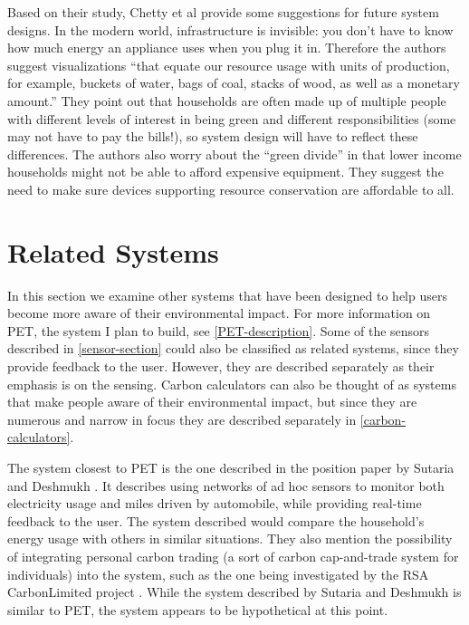 Based on their study, Chetty et al provide some suggestions for future system designs. In the modern world, infrastructure is invisible: you don't have to know how much energy an appliance uses when you plug it in. Therefore the authors suggest visualizations ``that equate our resource usage with units of production, for example, buckets of water, bags of coal, stacks of wood, as well as a monetary amount.'' They point out that households are often made up of multiple people with different levels of interest in being green and different responsibilities (some may not have to pay the bills!), so system design will have to reflect these differences. The authors also worry about the ``green divide'' in that lower income households might not be able to afford expensive equipment. They suggest the need to make sure devices supporting resource conservation are affordable to all.


\section{Related Systems}

In this section we examine other systems that have been designed to help users become more aware of their environmental impact. For more information on PET, the system I plan to build, see \autoref{PET-description}. Some of the sensors described in \autoref{sensor-section} could also be classified as related systems, since they provide feedback to the user. However, they are described separately as their emphasis is on the sensing. Carbon calculators can also be thought of as systems that make people aware of their environmental impact, but since they are numerous and narrow in focus they are described separately in \autoref{carbon-calculators}.

The system closest to PET is the one described in the position paper by Sutaria and Deshmukh \cite{sutaria-2008}. It describes using networks of ad hoc sensors to monitor both electricity usage and miles driven by automobile, while providing real-time feedback to the user. The system described would compare the household's energy usage with others in similar situations. They also mention the possibility of integrating personal carbon trading (a sort of carbon cap-and-trade system for individuals) into the system, such as the one being investigated by the RSA CarbonLimited project \cite{carbonlimited-2007}. While the system described by Sutaria and Deshmukh is similar to PET, the system appears to be hypothetical at this point.

